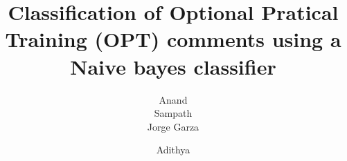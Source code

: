 \documentclass{sig-alternate-05-2015}
\begin{document}


\title{Classification of Optional Pratical Training (OPT) comments using a Naive bayes classifier}

%
%
%
%
%

%
\author{
%
%
\alignauthor 
Anand\\ 
\alignauthor Sampath\\
\alignauthor 
Jorge Garza\\
\and  %
\alignauthor 
Adithya\\
}
\end{document}
